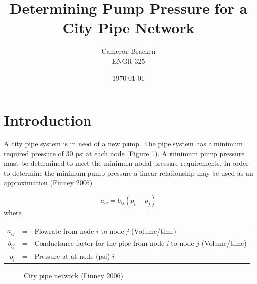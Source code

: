 \documentclass[titlepage,12pt,onehalfspacing]{article}
\begin{document}
\begin{singlespace}
\title{Determining Pump Pressure for a City Pipe Network}
\author{Cameron Bracken \\ENGR 325}
\date{\today}
\maketitle
\newpage
{}\pagestyle{myheadings}
\tableofcontents{}
\listoffigures {}
\listoftables
\newpage
\end{singlespace}
\pagestyle{headings} 
\section {Introduction}
A city pipe system is in need of a new pump.  The pipe system has a
minimum required pressure of 30 psi at each node (Figure 1).  A
minimum pump pressure must be determined to meet the minimum nodal
pressure requirements. In order to determine the minimum pump
pressure a linear relationship may be used as an approximation
(Finney 2006)

\begin{singlespacing}
\begin{equation}
a_{ij}=b_{ij}\left(p_i-p_j\right)
\end{equation}
where
\begin{center}
\begin{tabular}{rcl}
$a_{ij}$&=& Flowrate from node $i$ to node $j$ (Volume/time)\\
$b_{ij}$&=& Conductance factor for the pipe from node $i$ to node $j$ (Volume/time)\\
$p_i$&=& Pressure at at node (psi) $i$\\
\end{tabular}
\end{center}

\begin{figure}[h]
\begin{center}
 \caption{City pipe
network (Finney 2006)}
\end{center}
\end{figure}
\end{singlespacing}
\end{document}
